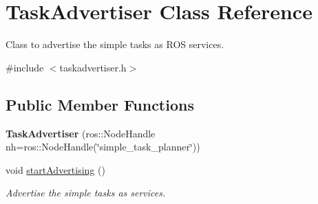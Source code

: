 \hypertarget{class_task_advertiser}{}\section{Task\+Advertiser Class Reference}
\label{class_task_advertiser}


Class to advertise the simple tasks as R\+OS services.  




{\ttfamily \#include $<$taskadvertiser.\+h$>$}

\subsection*{Public Member Functions}
\begin{DoxyCompactItemize}
\item 
{\bfseries Task\+Advertiser} (ros\+::\+Node\+Handle nh=ros\+::\+Node\+Handle(\char`\"{}simple\+\_\+task\+\_\+planner\char`\"{}))\hypertarget{class_task_advertiser_a55b983d7a922d0903a80d070f7b520c5}{}\label{class_task_advertiser_a55b983d7a922d0903a80d070f7b520c5}

\item 
void \hyperlink{class_task_advertiser_a23ee8ef6b343f52cd7b5d7d0dcbd6fe1}{start\+Advertising} ()\hypertarget{class_task_advertiser_a23ee8ef6b343f52cd7b5d7d0dcbd6fe1}{}\label{class_task_advertiser_a23ee8ef6b343f52cd7b5d7d0dcbd6fe1}

\begin{DoxyCompactList}\small\item\em Advertise the simple tasks as services. \end{DoxyCompactList}\end{DoxyCompactItemize}
